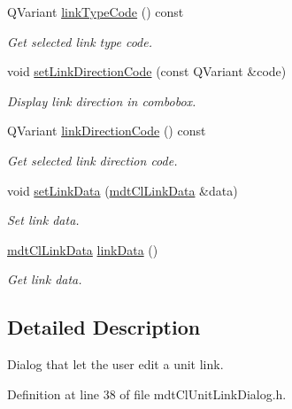 \begin{DoxyCompactItemize}
Q\-Variant \hyperlink{classmdt_cl_unit_link_dialog_aa7d8b93582d68113b6d00922e4979e78}{link\-Type\-Code} () const 
\begin{DoxyCompactList}\small\item\em Get selected link type code. \end{DoxyCompactList}\item 
void \hyperlink{classmdt_cl_unit_link_dialog_a23220c3ea0f051e9155ee9a2a052b5ea}{set\-Link\-Direction\-Code} (const Q\-Variant \&code)
\begin{DoxyCompactList}\small\item\em Display link direction in combobox. \end{DoxyCompactList}\item 
Q\-Variant \hyperlink{classmdt_cl_unit_link_dialog_a4ed022bb559da23be2d192b9e83c40e2}{link\-Direction\-Code} () const 
\begin{DoxyCompactList}\small\item\em Get selected link direction code. \end{DoxyCompactList}\item 
void \hyperlink{classmdt_cl_unit_link_dialog_a43ee4d2a395f42dcaa2667170e5ad0bc}{set\-Link\-Data} (\hyperlink{classmdt_cl_link_data}{mdt\-Cl\-Link\-Data} \&data)
\begin{DoxyCompactList}\small\item\em Set link data. \end{DoxyCompactList}\item 
\hyperlink{classmdt_cl_link_data}{mdt\-Cl\-Link\-Data} \hyperlink{classmdt_cl_unit_link_dialog_a9553b27b636bec6af4139afa11a5a2db}{link\-Data} ()
\begin{DoxyCompactList}\small\item\em Get link data. \end{DoxyCompactList}\end{DoxyCompactItemize}


\subsection{Detailed Description}
Dialog that let the user edit a unit link. 

Definition at line 38 of file mdt\-Cl\-Unit\-Link\-Dialog.\-h.



